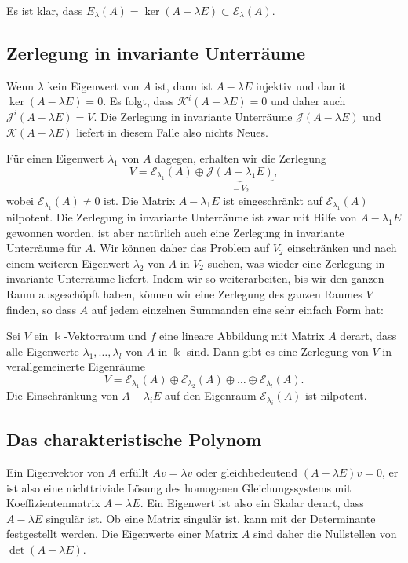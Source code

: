 Es ist klar, dass
$E_\lambda(A)=\ker (A-\lambda E)\subset\mathcal{E}_{\lambda}(A)$.

\subsection{Zerlegung in invariante Unterräume
\label{buch:subsection:zerlegung-in-invariante-unterraeume}}
Wenn $\lambda$ kein Eigenwert von $A$ ist, dann ist $A-\lambda E$
injektiv und damit $\ker(A-\lambda E)=0$.
Es folgt, dass $\mathcal{K}^i(A-\lambda E)=0$ und daher auch
$\mathcal{J}^i(A-\lambda E)=V$.
Die Zerlegung in invariante Unterräume $\mathcal{J}(A-\lambda E)$ und
$\mathcal{K}(A-\lambda E)$ liefert in diesem Falle also nichts Neues.

Für einen Eigenwert $\lambda_1$ von $A$ dagegen, erhalten wir die Zerlegung
\[
V
=
\mathcal{E}_{\lambda_1}(A)
\oplus
\underbrace{\mathcal{J}(A-\lambda_1 E)}_{\displaystyle =V_2},
\]
wobei $\mathcal{E}_{\lambda_1}(A)\ne 0$ ist.
Die Matrix $A-\lambda_1 E$ ist eingeschränkt auf $\mathcal{E}_{\lambda_1}(A)$
nilpotent.
Die Zerlegung in invariante Unterräume ist zwar mit Hilfe von $A-\lambda_1E$
gewonnen worden, ist aber natürlich auch eine Zerlegung in invariante 
Unterräume für $A$.
Wir können daher das Problem auf $V_2$ einschränken und nach einem weiteren
Eigenwert $\lambda_2$ von $A$ in $V_2$ suchen, was wieder eine Zerlegung
in invariante Unterräume liefert.
Indem wir so weiterarbeiten, bis wir den ganzen Raum ausgeschöpft haben,
können wir eine Zerlegung des ganzen Raumes $V$ finden, so dass $A$ auf
jedem einzelnen Summanden eine sehr einfach Form hat:

\begin{satz}
\label{buch:eigenwerte:satz:zerlegung-in-eigenraeume}
Sei $V$ ein $\Bbbk$-Vektorraum und $f$ eine lineare Abbildung mit Matrix
$A$ derart, dass alle Eigenwerte $\lambda_1,\dots,\lambda_l$ von $A$
in $\Bbbk$ sind.
Dann gibt es eine Zerlegung von $V$ in verallgemeinerte Eigenräume
\[
V
=
\mathcal{E}_{\lambda_1}(A)
\oplus
\mathcal{E}_{\lambda_2}(A)
\oplus
\dots
\oplus
\mathcal{E}_{\lambda_l}(A).
\]
Die Einschränkung von $A-\lambda_{i}E$ auf den Eigenraum 
$\mathcal{E}_{\lambda_i}(A)$ ist nilpotent.
\end{satz}

\subsection{Das charakteristische Polynom
\label{buch:subsection:das-charakteristische-polynom}}
Ein Eigenvektor von $A$ erfüllt $Av=\lambda v$ oder gleichbedeutend
$(A-\lambda E)v=0$, er ist also eine nichttriviale Lösung des homogenen
Gleichungssystems mit Koeffizientenmatrix $A-\lambda E$. 
Ein Eigenwert ist also ein Skalar derart, dass $A-\lambda E$
singulär ist.
Ob eine Matrix singulär ist, kann mit der Determinante festgestellt
werden.
Die Eigenwerte einer Matrix $A$ sind daher die Nullstellen
von $\det(A-\lambda E)$.

